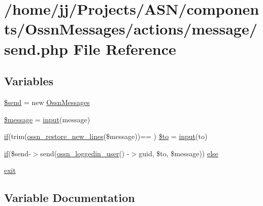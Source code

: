 \hypertarget{_ossn_messages_2actions_2message_2send_8php}{}\section{/home/jj/\+Projects/\+A\+S\+N/components/\+Ossn\+Messages/actions/message/send.php File Reference}
\label{_ossn_messages_2actions_2message_2send_8php}
\subsection*{Variables}
\begin{DoxyCompactItemize}
\item 
\hyperlink{_ossn_messages_2actions_2message_2send_8php_ac3ef1eb98db8a01e92b262323467d775}{\$send} = new \hyperlink{class_ossn_messages}{Ossn\+Messages}
\item 
\hyperlink{_ossn_messages_2actions_2message_2send_8php_abf17cb2dba2ed17cb28aa5f37deb5293}{\$message} = \hyperlink{ossn_8lib_8input_8php_a64ebee98b041c4f75f71ed3cd73cc8ed}{input}(\textquotesingle{}message\textquotesingle{})
\item 
\hyperlink{jquery_8tokeninput_8js_ad8dd46a3cbc004569e34401e9e71771a}{if}(trim(\hyperlink{ossn_8lib_8input_8php_a81d0b9187efc1b4c9988e918ae0f64ca}{ossn\+\_\+restore\+\_\+new\+\_\+lines}(\$message))== \textquotesingle{}\textquotesingle{}) \hyperlink{_ossn_messages_2actions_2message_2send_8php_ad0e9529b4e89689767bdc23a46f1d182}{\$to} = \hyperlink{ossn_8lib_8input_8php_a64ebee98b041c4f75f71ed3cd73cc8ed}{input}(\textquotesingle{}to\textquotesingle{})
\item 
\hyperlink{jquery_8tokeninput_8js_ad8dd46a3cbc004569e34401e9e71771a}{if}(\$send-\/$>$send(\hyperlink{ossn_8lib_8users_8php_aa3c8068d0e6638b414d6a2f6c62565b8}{ossn\+\_\+loggedin\+\_\+user}() -\/$>$guid, \$to, \$message)) \hyperlink{_ossn_messages_2actions_2message_2send_8php_acd6cab06649b8093f0070f6485236b8e}{else}
\item 
\hyperlink{_ossn_messages_2actions_2message_2send_8php_a6733eb5f605d09eaede9845835d71c4e}{exit}
\end{DoxyCompactItemize}


\subsection{Variable Documentation}
